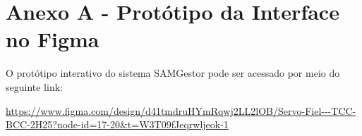 
\appendix
\chapter*{Anexo A - Protótipo da Interface no Figma}

O protótipo interativo do sistema SAMGestor pode ser acessado por meio do seguinte link:

\url{https://www.figma.com/design/d41tmdruHYmRqwj2LL2lOB/Servo-Fiel---TCC-BCC-2H25?node-id=17-20&t=W3T09fJeqrwljeok-1}
